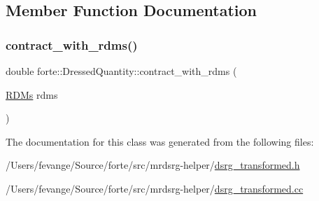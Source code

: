 \subsection{Member Function Documentation}
\mbox{\label{classforte_1_1_dressed_quantity_a349522c7b40185549cd5bc5114d413e7}} 
\subsubsection{\texorpdfstring{contract\+\_\+with\+\_\+rdms()}{contract\_with\_rdms()}}
{\footnotesize\ttfamily double forte\+::\+Dressed\+Quantity\+::contract\+\_\+with\+\_\+rdms (\begin{DoxyParamCaption}\item[{\mbox{\hyperlink{classforte_1_1_r_d_ms}{R\+D\+Ms}}}]{rdms }\end{DoxyParamCaption})}



The documentation for this class was generated from the following files\+:\begin{DoxyCompactItemize}
\item 
/\+Users/fevange/\+Source/forte/src/mrdsrg-\/helper/\mbox{\hyperlink{dsrg__transformed_8h}{dsrg\+\_\+transformed.\+h}}\item 
/\+Users/fevange/\+Source/forte/src/mrdsrg-\/helper/\mbox{\hyperlink{dsrg__transformed_8cc}{dsrg\+\_\+transformed.\+cc}}\end{DoxyCompactItemize}
